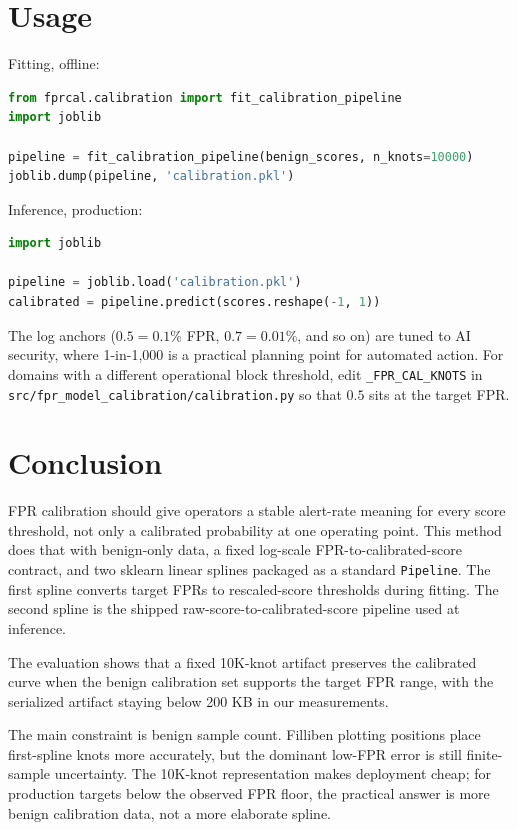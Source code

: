 \documentclass{article}
\begin{document}
\section{Usage}
\label{sec:usage}

Fitting, offline:

\begin{lstlisting}[language=Python]
from fprcal.calibration import fit_calibration_pipeline
import joblib

pipeline = fit_calibration_pipeline(benign_scores, n_knots=10000)
joblib.dump(pipeline, 'calibration.pkl')
\end{lstlisting}

Inference, production:

\begin{lstlisting}[language=Python]
import joblib

pipeline = joblib.load('calibration.pkl')
calibrated = pipeline.predict(scores.reshape(-1, 1))
\end{lstlisting}

The log anchors ($0.5 = 0.1\%$ FPR, $0.7 = 0.01\%$, and so on) are tuned to AI security, where 1-in-1{,}000 is a practical planning point for automated action.
For domains with a different operational block threshold, edit \texttt{\_FPR\_CAL\_KNOTS} in \texttt{src/fpr\_model\_calibration/calibration.py} so that $0.5$ sits at the target FPR.

\section{Conclusion}
\label{sec:conclusion}

FPR calibration should give operators a stable alert-rate meaning for every score threshold, not only a calibrated probability at one operating point.
This method does that with benign-only data, a fixed log-scale FPR-to-calibrated-score contract, and two sklearn linear splines packaged as a standard \texttt{Pipeline}.
The first spline converts target FPRs to rescaled-score thresholds during fitting.
The second spline is the shipped raw-score-to-calibrated-score pipeline used at inference.

The evaluation shows that a fixed 10K-knot artifact preserves the calibrated curve when the benign calibration set supports the target FPR range, with the serialized artifact staying below 200 KB in our measurements.

The main constraint is benign sample count.
Filliben plotting positions place first-spline knots more accurately, but the dominant low-FPR error is still finite-sample uncertainty.
The 10K-knot representation makes deployment cheap; for production targets below the observed FPR floor, the practical answer is more benign calibration data, not a more elaborate spline.
\end{document}
